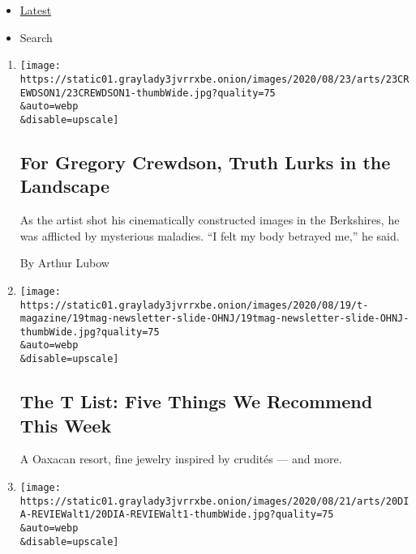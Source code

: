 \begin{itemize}
\tightlist
\item
  \protect\hyperlink{stream-panel}{Latest}
\item
  Search
\end{itemize}

\begin{enumerate}
\def\labelenumi{\arabic{enumi}.}
\item
  \href{/2020/08/20/arts/design/gregory-crewdson-berkshires-photography.html}{}

  \texttt{[image: https://static01.graylady3jvrrxbe.onion/images/2020/08/23/arts/23CREWDSON1/23CREWDSON1-thumbWide.jpg?quality=75\\\&auto=webp\\\&disable=upscale]}

  \hypertarget{for-gregory-crewdson-truth-lurks-in-the-landscape}{%
  \subsection{For Gregory Crewdson, Truth Lurks in the
  Landscape}\label{for-gregory-crewdson-truth-lurks-in-the-landscape}}

  As the artist shot his cinematically constructed images in the
  Berkshires, he was afflicted by mysterious maladies. ``I felt my body
  betrayed me,'' he said.

  By Arthur Lubow
\item
  \href{/2020/08/20/t-magazine/monte-uzulu-vivanterre-emme-parsons.html}{}

  \texttt{[image: https://static01.graylady3jvrrxbe.onion/images/2020/08/19/t-magazine/19tmag-newsletter-slide-OHNJ/19tmag-newsletter-slide-OHNJ-thumbWide.jpg?quality=75\\\&auto=webp\\\&disable=upscale]}

  \hypertarget{the-t-list-five-things-we-recommend-this-week}{%
  \subsection{The T List: Five Things We Recommend This
  Week}\label{the-t-list-five-things-we-recommend-this-week}}

  A Oaxacan resort, fine jewelry inspired by crudités --- and more.
\item
  \href{/2020/08/20/arts/design/dia-beacon-reopen-coronavirus.html}{}

  \texttt{[image: https://static01.graylady3jvrrxbe.onion/images/2020/08/21/arts/20DIA-REVIEWalt1/20DIA-REVIEWalt1-thumbWide.jpg?quality=75\\\&auto=webp\\\&disable=upscale]}


\end{enumerate}
